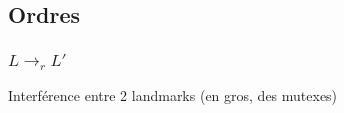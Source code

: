   \subsection{Ordres}

\begin{frame}
  \frametitle{$L \rightarrow_r L'$}

  \begin{block}{}
    Interférence entre 2 landmarks (en gros, des mutexes)
  \end{block}



\end{frame}
